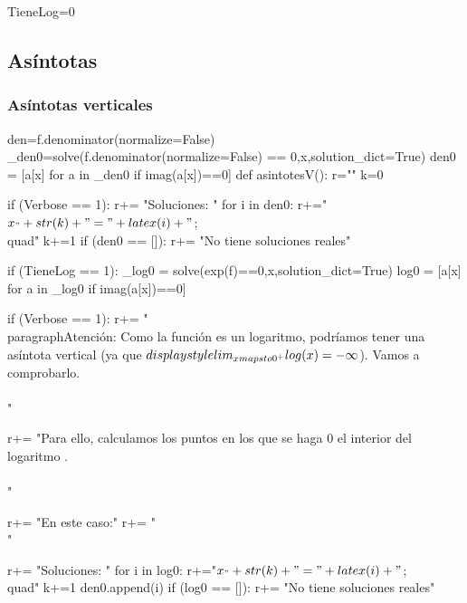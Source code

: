 \begin{sagesilent}
TieneLog=0
\end{sagesilent}




\subsection{Asíntotas}
\subsubsection{Asíntotas verticales}

\begin{sagesilent}
den=f.denominator(normalize=False)
_den0=solve(f.denominator(normalize=False) == 0,x,solution_dict=True)
den0 = [a[x] for a in _den0 if imag(a[x])==0]
def asintotesV():
    r=""
    k=0

    if (Verbose == 1):
        r+= "Soluciones: "
        for i in den0:
            r+="$x_"+str(k)+"="+latex(i)+" $;\\quad"
            k+=1
        if (den0 == []):
            r+= "No tiene soluciones reales"

    if (TieneLog == 1):
        _log0 = solve(exp(f)==0,x,solution_dict=True)
        log0 = [a[x] for a in _log0 if imag(a[x])==0]  

        if (Verbose == 1):
            r+= "\\paragraph{Atención: } Como la función es un logaritmo, podríamos tener una asíntota vertical (ya que $\\displaystyle\\lim_{x\\mapsto 0^+} \\log(x) = -\infty$). Vamos a comprobarlo.\\\\"

            r+= "Para ello, calculamos los puntos en los que se haga 0 el interior del logaritmo .\\\\"

        
            r+= "En este caso:"
        r+= "\\[ "+latex(exp(f))+"= 0 \\]"

        r+= "Soluciones: "
        for i in log0:
            r+="$x_"+str(k)+"="+latex(i)+" $;\\quad"
            k+=1
            den0.append(i)
        if (log0 == []):
            r+= "No tiene soluciones reales"


\end{sagesilent}
